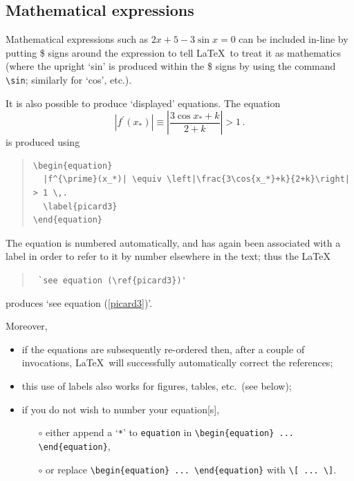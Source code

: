 \subsection{Mathematical expressions}

Mathematical expressions such as $2x+5-3\sin x=0$ can be included
in-line by putting \$ signs around the expression to tell \LaTeX\ to
treat it as mathematics (where the upright `sin' is produced within
the \$ signs by using the command \verb|\sin|; similarly for `cos',
etc.).

It is also possible to produce `displayed' equations.  The equation
\begin{equation}
  |f^{\prime}(x_*)| \equiv \left|\frac{3\cos{x_*}+k}{2+k}\right| > 1 \,.
  \label{picard3}
\end{equation}
is produced using
\begin{quote}
\begin{verbatim}
\begin{equation}
  |f^{\prime}(x_*)| \equiv \left|\frac{3\cos{x_*}+k}{2+k}\right| > 1 \,.
  \label{picard3}
\end{equation}
\end{verbatim}
\end{quote}
The equation is numbered automatically, and has again been associated
with a label in order to refer to it by number elsewhere in the text;
thus the \LaTeX
\begin{quote}
  \verb| `see equation (\ref{picard3})'|
\end{quote}
produces `see equation (\ref{picard3})'.

Moreover,
\begin{itemize}
\item if the equations are subsequently re-ordered then, after a
  couple of invocations, \LaTeX\ will successfully automatically
  correct the references;
\item this use of labels also works for figures, tables, etc.\ (see
  below);
\item if you do not wish to number your equation[s],
  \begin{itemize}
  \item[$\circ$] either append a `\verb|*|' to \verb|equation| in
    \verb|\begin{equation} ... \end{equation}|,
  \item[$\circ$] or replace \verb|\begin{equation} ... \end{equation}| with
    \verb|\[ ... \]|.
  \end{itemize}
\end{itemize}

